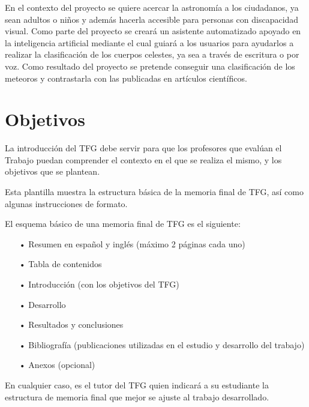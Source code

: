 \vspace{0.5cm}

En el contexto del proyecto se quiere acercar la astronomía a los ciudadanos, ya sean adultos o niños y además hacerla accesible para personas con discapacidad visual. Como parte del proyecto se creará un asistente automatizado apoyado en la inteligencia artificial mediante el cual guiará a los usuarios para ayudarlos a realizar la clasificación de los cuerpos celestes, ya sea a través de escritura o por voz.
Como resultado del proyecto se pretende conseguir una clasificación de los meteoros y contrastarla con las publicadas en artículos científicos.


\section{Objetivos}


La introducción del TFG debe servir para que los profesores que evalúan el Trabajo puedan comprender el contexto en el que se realiza el mismo, y los objetivos que se plantean.

Esta plantilla muestra la estructura básica de la memoria final de TFG, así como algunas instrucciones de formato.

El esquema básico de una memoria final de TFG es el siguiente:
\begin{itemize}
\item[•] Resumen en español y inglés (máximo 2 páginas cada uno)
\item[•] Tabla de contenidos
\item[•] Introducción (con los objetivos del TFG)
\item[•] Desarrollo
\item[•] Resultados y conclusiones
\item[•] Bibliografía (publicaciones utilizadas en el estudio y desarrollo del trabajo)
\item[•] Anexos (opcional)
\end{itemize}

En cualquier caso, es el tutor del TFG quien indicará a su estudiante la estructura de memoria final que mejor se ajuste al trabajo desarrollado.

